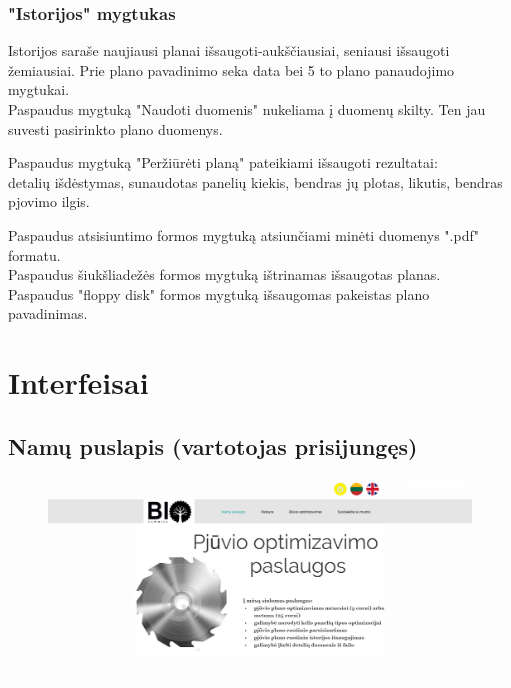 \documentclass[a4paper,12pt]{article}
\begin{document}
\subsubsection{"Istorijos" mygtukas}
Istorijos saraše naujiausi planai išsaugoti-aukščiausiai, seniausi išsaugoti žemiausiai.
Prie plano pavadinimo seka data bei 5 to plano panaudojimo mygtukai.\\
Paspaudus mygtuką "Naudoti duomenis" nukeliama į duomenų skilty.
Ten jau suvesti pasirinkto plano duomenys.

Paspaudus mygtuką "Peržiūrėti planą" pateikiami išsaugoti rezultatai:\\
detalių išdėstymas, sunaudotas panelių kiekis, bendras jų plotas, likutis, bendras pjovimo ilgis.

Paspaudus atsisiuntimo formos mygtuką atsiunčiami minėti duomenys ".pdf" formatu.\\
Paspaudus šiukšliadežės formos mygtuką ištrinamas išsaugotas planas.\\
Paspaudus "floppy disk" formos mygtuką išsaugomas pakeistas plano pavadinimas.

\clearpage

\section{Interfeisai}

\subsection{Namų puslapis (vartotojas prisijungęs)}
\begin{figure}[!tph]
\hspace{-3cm}
\centering
\includegraphics[scale=0.5]{interfeisai/pagrindinis}
\label{fig:verticalcell}
\end{figure}
\end{document}
